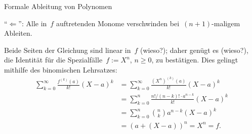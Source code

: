 \documentclass{algblatt}
\begin{document}
\begin{aufgabe}{Formale Ableitung von Polynomen}
\begin{loesungE}
"`$\Longleftarrow$"': Alle in~$f$ auftretenden Monome verschwinden bei~$(n+1)$-maligem Ableiten.

\item Beide Seiten der Gleichung sind linear in~$f$ (wieso?); daher genügt es
(wieso?), die Identität für die Spezialfälle~$f := X^n$, $n \geq 0$, zu
bestätigen. Dies gelingt mithilfe des binomischen Lehrsatzes:
\begin{align*}
  \sum_{k=0}^\infty \frac{f^{(k)}(a)}{k!} (X-a)^k &=
  \sum_{k=0}^\infty \frac{(X^n)^{(k)}(a)}{k!} (X-a)^k \\
  &= \sum_{k=0}^n \frac{n! / (n-k)! \cdot a^{n-k}}{k!} (X-a)^k \\
  &= \sum_{k=0}^n \binom{n}{k} a^{n-k} (X-a)^k \\
  &= (a + (X-a))^n = X^n = f.
\end{align*}
\end{loesungE}
\end{aufgabe}
\end{document}
